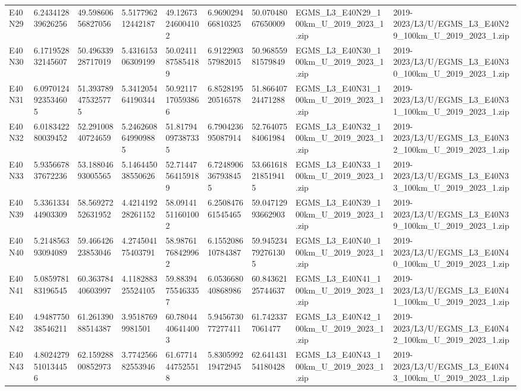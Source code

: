 \begin{landscape}
\begin{longtable}{lllllllll}
E40N29 & 6.243412839626256 & 49.59860656827056 & 5.517796212442187 & 49.12673246004102 & 6.969029466810325 & 50.07048067650009 & EGMS\_L3\_E40N29\_100km\_U\_2019\_2023\_1.zip & 2019-2023/L3/U/EGMS\_L3\_E40N29\_100km\_U\_2019\_2023\_1.zip \\
E40N30 & 6.171952832145607 & 50.49633928717019 & 5.431615306309199 & 50.02411875854189 & 6.912290357982015 & 50.96855981579849 & EGMS\_L3\_E40N30\_100km\_U\_2019\_2023\_1.zip & 2019-2023/L3/U/EGMS\_L3\_E40N30\_100km\_U\_2019\_2023\_1.zip \\
E40N31 & 6.0970124923534605 & 51.393789475325775 & 5.341205464190344 & 50.92117170593866 & 6.852819520516578 & 51.86640724471288 & EGMS\_L3\_E40N31\_100km\_U\_2019\_2023\_1.zip & 2019-2023/L3/U/EGMS\_L3\_E40N31\_100km\_U\_2019\_2023\_1.zip \\
E40N32 & 6.018342280039452 & 52.29100840724659 & 5.2462608649909885 & 51.81794097387335 & 6.790423695087914 & 52.76407584061984 & EGMS\_L3\_E40N32\_100km\_U\_2019\_2023\_1.zip & 2019-2023/L3/U/EGMS\_L3\_E40N32\_100km\_U\_2019\_2023\_1.zip \\
E40N33 & 5.935667837672236 & 53.18804693005565 & 5.146445038550626 & 52.71447564159189 & 6.7248906367938455 & 53.661618218519415 & EGMS\_L3\_E40N33\_100km\_U\_2019\_2023\_1.zip & 2019-2023/L3/U/EGMS\_L3\_E40N33\_100km\_U\_2019\_2023\_1.zip \\
E40N39 & 5.336133444903309 & 58.56927252631952 & 4.421419228261152 & 58.09141511601002 & 6.250847661545465 & 59.04712993662903 & EGMS\_L3\_E40N39\_100km\_U\_2019\_2023\_1.zip & 2019-2023/L3/U/EGMS\_L3\_E40N39\_100km\_U\_2019\_2023\_1.zip \\
E40N40 & 5.214856393094089 & 59.46642623853046 & 4.274504175403791 & 58.98761768429962 & 6.155208610784387 & 59.945234792761305 & EGMS\_L3\_E40N40\_100km\_U\_2019\_2023\_1.zip & 2019-2023/L3/U/EGMS\_L3\_E40N40\_100km\_U\_2019\_2023\_1.zip \\
E40N41 & 5.085978183196545 & 60.36378440603997 & 4.118288325524105 & 59.88394755463357 & 6.053668040868986 & 60.84362125744637 & EGMS\_L3\_E40N41\_100km\_U\_2019\_2023\_1.zip & 2019-2023/L3/U/EGMS\_L3\_E40N41\_100km\_U\_2019\_2023\_1.zip \\
E40N42 & 4.948775038546211 & 61.26139088514387 & 3.95187699981501 & 60.78044406414003 & 5.945673077277411 & 61.7423377061477 & EGMS\_L3\_E40N42\_100km\_U\_2019\_2023\_1.zip & 2019-2023/L3/U/EGMS\_L3\_E40N42\_100km\_U\_2019\_2023\_1.zip \\
E40N43 & 4.8024279510134456 & 62.15928800852973 & 3.774256682553946 & 61.67714447525518 & 5.830599219472945 & 62.64143154180428 & EGMS\_L3\_E40N43\_100km\_U\_2019\_2023\_1.zip & 2019-2023/L3/U/EGMS\_L3\_E40N43\_100km\_U\_2019\_2023\_1.zip \\

\end{longtable}
\end{landscape}
